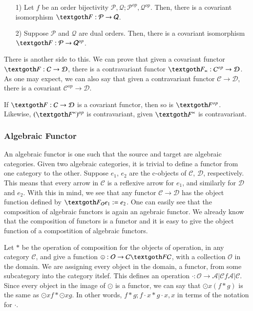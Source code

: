 \documentclass [12pt]{book}
\begin{document}
\begin{corollary}\makebox[5pt][]{}\mbox {}\begin{itemize}\item[1)]Let $f$ be an order bijectivity $\mathcal P,\mathcal Q;\mathcal P^{op},\mathcal Q^{op}$. Then, there is a covariant isomorphism $\textgoth F:\mathcal P\rightarrow\mathcal Q$.\item[2)]Suppose $\mathcal P$ and $\mathcal Q$ are dual orders. Then, there is a covariant isomorphism $\textgoth F:\mathcal P\rightarrow\mathcal Q^{op}$.\end{itemize}\end{corollary}

There is another side to this. We can prove that given a covariant functor $\textgoth F:\mathcal C\rightarrow\mathcal D$, there is a contravariant functor $\textgoth F_\ltimes:\mathcal C^{op}\rightarrow\mathcal D$. As one may expect, we can also say that given a contravariant functor $\mathcal C\rightarrow\mathcal D$, there is a covariant $\mathcal C^{op}\rightarrow\mathcal D$.

\begin{proposition}If $\textgoth F:\mathcal C\rightarrow\mathcal D$ is a covariant functor, then so is $\textgoth F^{op}$. Likewise, $(\textgoth F^\ltimes)^{op}$ is contravariant, given $\textgoth F^\ltimes$ is contravariant.\end{proposition}

\subsubsection{Algebraic Functor}An algebraic functor is one such that the source and target are algebraic categories. Given two algebraic categories, it is trivial to define a functor from one category to the other. Suppose $e_1$, $e_2$ are the c-objects of $\mathcal C$, $\mathcal D$, respectively. This means that every arrow in $\mathcal C$ is a reflexive arrow for $e_1$, and similarly for $\mathcal D$ and $e_2$. With this in mind, we see that any functor $\mathcal C\rightarrow\mathcal D$ has the object function defined by $\textgoth F_\mathcal Oe_1:=e_2$. One can easily see that the composition of algebraic functors is again an agebraic functor. We already know that the composition of functors is a functor and it is easy to give the object function of a compostition of algebraic functors.

Let $*$ be the operation of composition for the objects of operation, in any category $\mathcal C$, and give a function $\odot:\mathcal O\rightarrow\mathcal C\textgoth F\mathcal C$, with a collection $\mathcal O$ in the domain. We are assigning every object in the domain, a functor, from some subcategory into the category itslef. This defines an operation $\cdot:\mathcal O\rightarrow\mathcal{A|C}f\mathcal{A|C}$. Since every object in the image of $\odot$ is a functor, we can say that $\odot x(f*g)$ is the same as $\odot xf*\odot xg$. In other words, $f*g;f\cdot x*g\cdot x,x$ in terms of the notation for $\cdot$.
\end{document}

